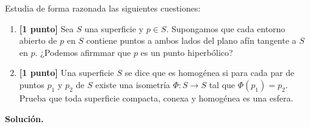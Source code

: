 \documentclass[12pt]{article}
\begin{document}
    \begin{ejercicio}
        Estudia de forma razonada las siguientes cuestiones:
        \begin{enumerate}[label=\alph*)]
            \item \textbf{[1 punto]} Sea $S$ una superficie y $p\in S$. Supongamos que cada entorno abierto de $p$ en $S$ contiene puntos a ambos lados del plano afín tangente a $S$ en $p.$ ¿Podemos afirmmar que $p$ es un punto hiperbólico?
            \item \textbf{[1 punto]} Una superficie $S$ se dice que es homogénea si para cada par de puntos $p_1$ y $p_2$ de $S$ existe una isometría $\Phi:S\to S$ tal que $\Phi(p_1) = p_2$. Prueba que toda superficie compacta, conexa y homogénea es una esfera.
        \end{enumerate}
    \end{ejercicio}

    \newpage
    \setcounter{ejercicio}{0}
    \noindent
    \textbf{Solución.}
\end{document}
